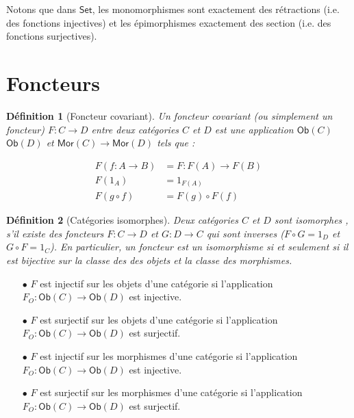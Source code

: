 \documentclass[justified]{tufte-handout}
\newtheorem{definition}{Définition}
\newtheorem{prop}{Proposition}
\def\msf{\mathsf}
\begin{document}
Notons que dans $\msf{Set}$, les monomorphismes sont exactement des rétractions
(i.e. des fonctions injectives) et les épimorphismes exactement des section
(i.e. des fonctions surjectives).

\section{Foncteurs}

\begin{definition}[Foncteur covariant]
	Un foncteur covariant (ou simplement un foncteur) $F : C \rightarrow D$ entre deux catégories $C$ et $D$ est une application $\msf{Ob}(C)$ \rightarrow $\msf{Ob}(D)$ et $\msf{Mor}(C) \rightarrow \msf{Mor}(D)$ tels que :

	\begin{align*}
		F(f : A \rightarrow B) & = F : F(A) \rightarrow F(B) \\
		F(1_A)                 & = 1_{F(A)}                  \\
		F(g \circ f)           & = F(g) \circ F(f)
	\end{align*}
\end{definition}

\begin{definition}[Catégories isomorphes]
	Deux catégories $C$ et $D$ sont isomorphes , s'il existe des foncteurs $F : C \rightarrow D$ et $G : D \rightarrow C$ qui sont inverses ($F \circ G = 1_D$ et $G \circ F = 1_C$).
	En particulier, un foncteur est un isomorphisme si et seulement si il est bijective sur la classe des des objets et la classe des morphismes.
\end{definition}

\begin{itemize}
	\item[$\bullet$] $F$ est injectif sur les objets d'une catégorie si l'application $F_O : \msf{Ob}(C) \rightarrow \msf{Ob}(D)$ est injective.
	\item[$\bullet$] $F$ est surjectif sur les objets d'une catégorie si l'application $F_O : \msf{Ob}(C) \rightarrow \msf{Ob}(D)$ est surjectif.

		\vspace{5pt}

	\item[$\bullet$] $F$ est injectif sur les morphismes d'une catégorie si l'application $F_O : \msf{Ob}(C) \rightarrow \msf{Ob}(D)$ est injective.
	\item[$\bullet$] $F$ est surjectif sur les morphismes d'une catégorie si l'application $F_O : \msf{Ob}(C) \rightarrow \msf{Ob}(D)$ est surjectif.
\end{itemize}
\end{document}

